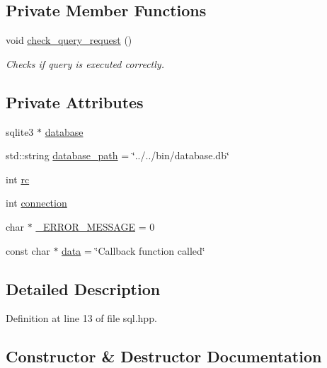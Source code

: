 \subsection*{Private Member Functions}
\begin{DoxyCompactItemize}
\item 
void \hyperlink{classsql_a4bdab1846b3789ddd83521d5eec019b5}{check\+\_\+query\+\_\+request} ()
\begin{DoxyCompactList}\small\item\em Checks if query is executed correctly. \end{DoxyCompactList}\end{DoxyCompactItemize}
\subsection*{Private Attributes}
\begin{DoxyCompactItemize}
\item 
sqlite3 $\ast$ \hyperlink{classsql_a16d6812a301ce81d856e7d5800bf20fd}{database}
\item 
std\+::string \hyperlink{classsql_aa0b79c68df90d2e2a3f829e25a44b878}{database\+\_\+path} = \char`\"{}../../bin/database.\+db\char`\"{}
\item 
int \hyperlink{classsql_a1ad7137a182503f7676b53f6fa2786ed}{rc}
\item 
int \hyperlink{classsql_a9eacc4ecb1f8cb870c2234adba85d31f}{connection}
\item 
char $\ast$ \hyperlink{classsql_a2d17635b5b4cf20d48ba354e2330b734}{\+\_\+\+E\+R\+R\+O\+R\+\_\+\+M\+E\+S\+S\+A\+GE} = 0
\item 
const char $\ast$ \hyperlink{classsql_a88d67d82b4bd8be3d1e31719a0d8f35e}{data} = \char`\"{}Callback function called\char`\"{}
\end{DoxyCompactItemize}


\subsection{Detailed Description}


Definition at line 13 of file sql.\+hpp.



\subsection{Constructor \& Destructor Documentation}
\mbox{\label{classsql_ac9b186df2a51d7eda72cd4a9c34c0624}} 
